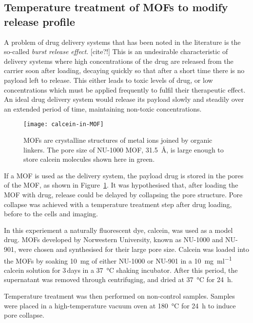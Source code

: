\subsection{Temperature treatment of MOFs to modify release profile} \label{sec:mof-temperature}
A problem of drug delivery systems that has been noted in the literature is the so-called \textit{burst release effect}. [cite?!]
This is an undesirable characteristic of delivery systems where high concentrations of the drug are released from the carrier soon after loading, decaying quickly so that after a short time there is no payload left to release. 
This either leads to toxic levels of drug, or low concentrations which must be applied frequently to fulfil their therapeutic effect. 
An ideal drug delivery system would release its payload slowly and steadily over an extended period of time, maintaining non-toxic concentrations. 

\begin{figure}[htbp!]
\centering
\texttt{[image: calcein-in-MOF]}
\caption[MOFs: The NU-1000 MOF has a large pore size to store other molecules]{MOFs are crystalline structures of metal ions joined by organic linkers. The pore size of NU-1000 MOF, \SI{31.5}{\angstrom}, is large enough to store calcein molecules shown here in green.}
\label{fig:calcein-in-MOF}
\end{figure}

If a MOF is used as the delivery system, the payload drug is stored in the pores of the MOF, as shown in Figure~\ref{fig:calcein-in-MOF}. 
It was hypothesised that, after loading the MOF with drug, release could be delayed by collapsing the pore structure. 
Pore collapse was achieved with a temperature treatment step after drug loading, before to the cells and imaging. 

In this experiement a naturally fluorescent dye, calcein, was used as a model drug. 
MOFs developed by Norwestern University, known as NU-1000 and NU-901, were chosen and synthesised for their large pore size. 
Calcein was loaded into the MOFs by soaking \SI{10}{\milli\gram} of either NU-1000 or NU-901 in a \SI[per-mode=symbol]{10}{\milli\gram\per\milli\litre} calcein solution for 3\,days in a \SI{37}{\degreeCelsius} shaking incubator. 
After this period, the supernatant was removed through centrifuging, and dried at \SI{37}{\degreeCelsius} for \SI{24}{\hour}. 

Temperature treatment was then performed on non-control samples. 
Samples were placed in a high-temperature vacuum oven at \SI{180}{\degreeCelsius} for \SI{24}{\hour} to induce pore collapse. 

